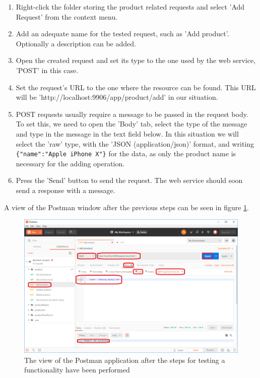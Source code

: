 \documentclass[12pt,a4paper,twoside]{report}
\begin{document}
\begin{enumerate}
  \item Right-click the folder storing the product related requests and select 'Add Request' from the context menu.
  \item Add an adequate name for the tested request, such as 'Add product'. Optionally a description can be added.
  \item Open the created request and set its type to the one used by the web service, 'POST' in this case.
  \item Set the request's URL to the one where the resource can be found. This URL will be 'http://localhost:9906/app/product/add' in our situation.
  \item POST requests usually require a message to be passed in the request body. To set this, we need to open the 'Body' tab, select the type of the message and type in the message in the text field below. In this situation we will select the 'raw' type, with the 'JSON (application/json)' format, and writing \lstinline${"name":"Apple iPhone X"}$ for the data, as only the product name is necessary for the adding operation.
  \item Press the 'Send' button to send the request. The web service should soon send a response with a message.
\end{enumerate}

A view of the Postman window after the previous steps can be seen in figure \ref{fig:postman_add_product_example}.

\begin{figure}[ht]
  \centering
  \includegraphics[width=\linewidth]{img/postman_add_product_example.png}
  \caption[]{The view of the Postman application after the steps for testing a functionality have been performed}
  \label{fig:postman_add_product_example}
\end{figure}
\end{document}
